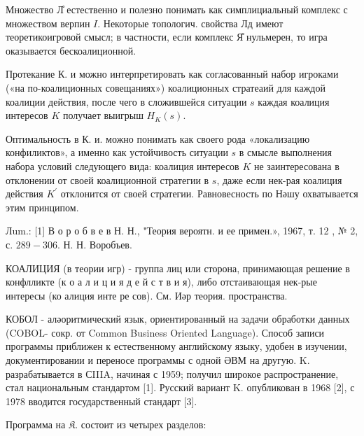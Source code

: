 \documentclass[10pt]{article}
\begin{document}
Множество Л̊ естественно и полезно понимать как симплициальный комплекс с множеством верпин $I$. Некоторые топологич. свойства Лд имеют теоретикоигровой смысл; в частности, если комплекс Я̊ нульмерен, то игра оказывается бескоалиционной.



Протекание К. и можно интерпретировать как согласованный набор игроками («на по-коалиционных совещаниях») коалиционных стратеаий для каждой коалиции действия, после чего в сложившейся ситуации $s$ каждая коалиция интересов $K$ получает выигрыш $H_{K}(s)$.



Оптимальность в К. и. можно понимать как своего рода «локализацию конфиликтов», а именно как устойчивость ситуации $s$ в смысле выполнения набора условий следующего вида: коалиция интересов $K$ не заинтересована в отклонении от своей коалиционной стратегии в $s$, даже если нек-рая коалиция действия $K^{\prime}$ отклонится от своей стратегии. Равновесность по Нәшу охватывается этим принципом.



Лum.: [1] В о р о б в е в Н. Н., "Теория вероятн. и ее примен.», 1967, т. 12 , № 2, с. $289-306$. Н. Н. Воробъев.



КОАЛИЦИЯ (в теории игр) - группа лиц или сторона, принимающая решение в конфлликте (к о а л и ц и я д е й с т в и я), либо отстаивающая нек-рые интересы (ко алиция инте ре сов). См. Иәр теория. пространства.



КОБОЛ - аләоритмический язык, ориентированный на задачи обработки данных (COBOL- сокр. от Common Business Oriented Language). Способ записи программы приближен к естественному английскому языку, удобен в изучении, документировании и переносе программы с одной ӘВМ на другую. K. разрабатывается в СIIIA, начиная с 1959; получил широкое распространение, стал национальным стандартом [1]. Русский вариант K. опубликован в 1968 [2], с 1978 вводится государственный стандарт [3].



Программа на $\mathfrak{K}$. состоит из четырех разделов:
\end{document}
